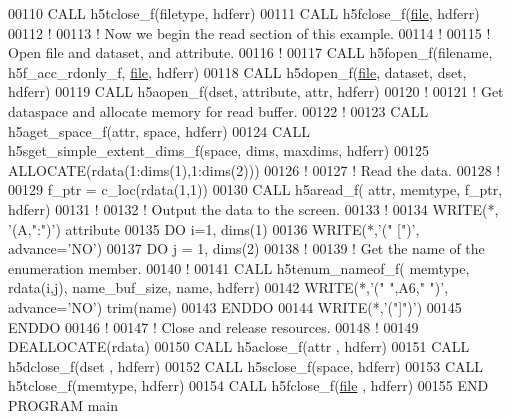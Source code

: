 \begin{DoxyCode}
00110   \textcolor{keyword}{CALL }h5tclose\_f(filetype, hdferr)
00111   \textcolor{keyword}{CALL }h5fclose\_f(\hyperlink{structfile}{file}, hdferr)
00112   \textcolor{comment}{!}
00113   \textcolor{comment}{! Now we begin the read section of this example.}
00114   \textcolor{comment}{!}
00115   \textcolor{comment}{! Open file and dataset, and attribute.}
00116   \textcolor{comment}{!}
00117   \textcolor{keyword}{CALL }h5fopen\_f(filename, h5f\_acc\_rdonly\_f, \hyperlink{structfile}{file}, hdferr)
00118   \textcolor{keyword}{CALL }h5dopen\_f(\hyperlink{structfile}{file}, dataset, dset, hdferr)
00119   \textcolor{keyword}{CALL }h5aopen\_f(dset, attribute, attr, hdferr)
00120   \textcolor{comment}{!}
00121   \textcolor{comment}{! Get dataspace and allocate memory for read buffer.}
00122   \textcolor{comment}{!}
00123   \textcolor{keyword}{CALL }h5aget\_space\_f(attr, space, hdferr)
00124   \textcolor{keyword}{CALL }h5sget\_simple\_extent\_dims\_f(space, dims, maxdims, hdferr)
00125   \textcolor{keyword}{ALLOCATE}(rdata(1:dims(1),1:dims(2)))
00126   \textcolor{comment}{!}
00127   \textcolor{comment}{! Read the data.}
00128   \textcolor{comment}{!}
00129   f\_ptr = c\_loc(rdata(1,1))
00130   \textcolor{keyword}{CALL }h5aread\_f( attr, memtype, f\_ptr, hdferr)
00131   \textcolor{comment}{!}
00132   \textcolor{comment}{! Output the data to the screen.}
00133   \textcolor{comment}{!}
00134   \textcolor{keyword}{WRITE}(*, \textcolor{stringliteral}{'(A,":")'}) attribute
00135   \textcolor{keywordflow}{DO} i=1, dims(1)
00136      \textcolor{keyword}{WRITE}(*,\textcolor{stringliteral}{'(" [")'}, advance=\textcolor{stringliteral}{'NO'})
00137      \textcolor{keywordflow}{DO} j = 1, dims(2)
00138         \textcolor{comment}{!}
00139         \textcolor{comment}{! Get the name of the enumeration member.}
00140         \textcolor{comment}{!}
00141         \textcolor{keyword}{CALL }h5tenum\_nameof\_f( memtype, rdata(i,j), name\_buf\_size, name, hdferr) 
00142         \textcolor{keyword}{WRITE}(*,\textcolor{stringliteral}{'(" ",A6," ")'}, advance=\textcolor{stringliteral}{'NO'}) trim(name)
00143 \textcolor{keywordflow}{     ENDDO}
00144      \textcolor{keyword}{WRITE}(*,\textcolor{stringliteral}{'("]")'})
00145 \textcolor{keywordflow}{  ENDDO}
00146   \textcolor{comment}{!}
00147   \textcolor{comment}{! Close and release resources.}
00148   \textcolor{comment}{!}
00149   \textcolor{keyword}{DEALLOCATE}(rdata)
00150   \textcolor{keyword}{CALL }h5aclose\_f(attr , hdferr)
00151   \textcolor{keyword}{CALL }h5dclose\_f(dset , hdferr)
00152   \textcolor{keyword}{CALL }h5sclose\_f(space, hdferr)
00153   \textcolor{keyword}{CALL }h5tclose\_f(memtype, hdferr)
00154   \textcolor{keyword}{CALL }h5fclose\_f(\hyperlink{structfile}{file} , hdferr)
00155 \textcolor{keyword}{END PROGRAM }main
\end{DoxyCode}
